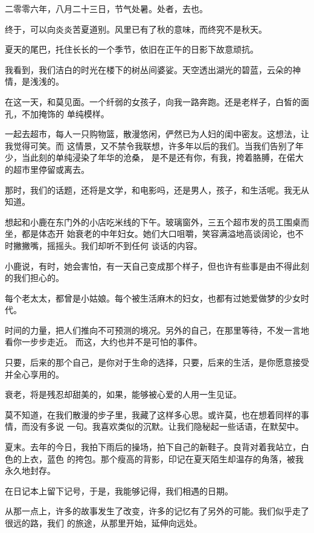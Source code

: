 	\endwriting



		二零零六年，八月二十三日，节气处暑。处者，去也。\par
		终于，可以向炎炎苦夏道别。风里已有了秋的意味，而终究不是秋天。\par
		夏天的尾巴，托住长长的一个季节，依旧在正午的日影下故意顽抗。\par
		我看到，我们洁白的时光在楼下的树丛间婆娑。天空透出湖光的碧蓝，云朵的神情，是浅浅的。

		在这一天，和莫见面。一个纤弱的女孩子，向我一路奔跑。还是老样子，白皙的面孔，不加掩饰的
	单纯模样。

		一起去超市，每人一只购物篮，散漫悠闲，俨然已为人妇的闺中密友。这想法，让我觉得可笑。而
	这情景，又不禁令我联想，许多年以后的我们。当我们告别了年少，当此刻的单纯浸染了年华的沧桑，
	是不是还有你，有我，挎着胳膊，在偌大的超市里停留或离去。

		那时，我们的话题，还将是文学，和电影吗，还是男人，孩子，和生活呢。我无从知道。

		想起和小鹿在东门外的小店吃米线的下午。玻璃窗外，三五个超市发的员工围桌而坐，都是体态开
	始衰老的中年妇女。她们大口咀嚼，笑容满溢地高谈阔论，也不时撇撇嘴，摇摇头。我们却听不到任何
	谈话的内容。

		小鹿说，有时，她会害怕，有一天自己变成那个样子，但也许有些事是由不得此刻的我们担心的。

		每个老太太，都曾是小姑娘。每个被生活麻木的妇女，也都有过她爱做梦的少女时代。

		时间的力量，把人们推向不可预测的境况。另外的自己，在那里等待，不发一言地看你一步步走近。
	而这，大约也并不是可怕的事件。

		只要，后来的那个自己，是你对于生命的选择，只要，后来的生活，是你愿意接受并全心享用的。

		衰老，将是残忍却甜美的，如果，能够被心爱的人用一生见证。

		莫不知道，在我们散漫的步子里，我藏了这样多心思。或许莫，也在想着同样的事情，而没有多说
	一句。我喜欢类似的沉默。让我们隐秘起一些话语，在默契中。

		夏末。去年的今日，我拍下雨后的操场，拍下自己的新鞋子。良背对着我站立，白色的上衣，蓝色
	的挎包。那个瘦高的背影，印记在夏天陌生却温存的角落，被我永久地封存。

		在日记本上留下记号，于是，我能够记得，我们相遇的日期。

		从那一点上，许多的故事发生了改变，许多的记忆有了另外的可能。我们似乎走了很远的路，我们
	的旅途，从那里开始，延伸向远处。

